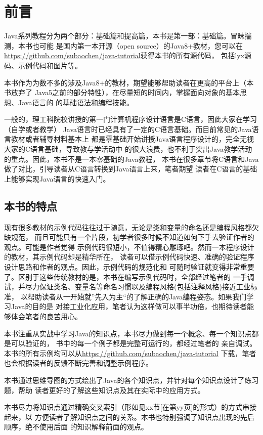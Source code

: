 \frontmatter
\chapter{前言}
Java系列教程分为两个部分：基础篇和提高篇，本书是第一部：基础篇。冒昧揣测，本书也可能
是国内第一本开源（open source）的Java8+教材，您可以在
\url{https://github.com/subaochen/java-tutorial}获得本书的所有源代码，
包括lyx源码、示例代码和图片等。

本书作为为数不多的涉及Java8+的教材，期望能够帮助读者在更高的平台上（本书放弃了
Java5之前的部分特性），在尽量短的时间内，掌握面向对象的基本思想、Java语言的
的基础语法和编程技能。

一般的，理工科院校讲授的第一门计算机程序设计语言是C语言，因此大家在学习（自学或者教学）
Java语言时已经具有了一定的C语言基础。而目前常见的Java语言教材或者辅导材料基本上
都是零基础开始讲授Java语言程序设计的，完全无视大家的C语言基础，导致教与学活动中
的很大浪费，也不利于突出Java教学活动的重点。因此，本书不是一本零基础的Java教程，
本书在很多章节将C语言和Java做了对比，引导读者从C语言转换到Java语言上来，笔者期望
读者在C语言的基础上能够实现Java语言的快速入门。

\section*{本书的特点}
现有很多教材的示例代码往往过于随意，无论是类和变量的命名还是编程风格都欠缺规范，
而且可能只有一个片段，初学者很多时候不知道如何下手去验证作者的观点。可能是作者觉得
示例代码很短小，不值得精心雕琢吧。然而一本程序设计的教材，其示例代码却是精华所在，
读者可以借示例代码快速、准确的验证程序设计思路和作者的观点。因此，示例代码的规范化和
可随时验证就变得非常重要了。区别于这些传统教材的是，本书在编写示例代码时，全部经过笔者的
一手调试，并尽力保证类名、变量名等命名习惯以及编程风格(包括注释风格)接近工业标准，
以帮助读者从一开始就”先入为主“的了解正确的Java编程姿态。如果我们学习Java的目的是
对接工业化应用，笔者认为这样做可以事半功倍，也期待读者能够体会笔者的良苦用心。

本书注重从实战中学习Java的知识点，本书尽力做到每一个概念、每一个知识点都是可以验证的，
书中的每一个例子都是完整可运行的，都经过笔者的
亲自调试。本书的所有示例均可以从\url{https://github.com/subaochen/java-tutorial}
下载，笔者也会根据读者的反馈不断完善和调整示例程序。

本书通过思维导图的方式绘出了Java的各个知识点，并针对每个知识点设计了练习题，帮助
读者更好的了解这些知识点及其在实际中的应用方式。

本书尽力将知识点通过精确交叉索引（形如见xx节[在第yy页]的形式）的方式串接起来，以
方便读者了解知识点之间的关系。本书也特别强调了知识点出现的先后顺序，绝不使用后面
的知识解释前面的观点。

